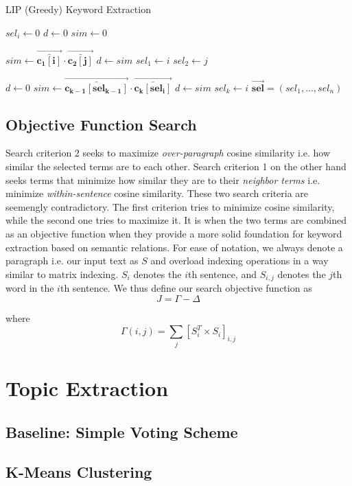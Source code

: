 \documentclass[12pt]{article}
\begin{document}
\begin{algorithm}[H]
\caption{LIP (Greedy) Keyword Extraction}\label{euclid}
\begin{algorithmic}[1]
\State $sel_i \gets 0$
 \EndFor
\State $d \gets 0$
\State $sim \gets 0$

            \State$sim \gets\bm{\vec{\bar{c_1[i]}}} \cdot \bm{\vec{\bar{c_2[j]}}}$
              \State $d \gets sim$
              \State$ sel_1 \gets i$
              \State $ sel_2 \gets j$
         \EndIf
        \EndFor
\EndFor

    \State $d \gets 0$
        \State$sim \gets \bm{\vec{\bar{c_{k-1}[sel_{k-1}]}}} \cdot \bm{\vec{\bar{c_{k}[sel_{i}]}}}$     
              \State$d \gets sim$
              \State$sel_k \gets i$
        \EndIf
    \EndFor
\EndFor
\Return $\bm{\vec{sel}} = (sel_1, ..., sel_n)$

\EndProcedure
\end{algorithmic}
\end{algorithm}


\subsection{Objective Function Search}
Search criterion 2 seeks to maximize \textit{over-paragraph} cosine similarity i.e. how similar the selected terms are to each other. Search criterion 1 on the other hand seeks terms that minimize how similar they are to their \textit{neighbor terms} i.e. minimize \textit{within-sentence} cosine similarity. These two search criteria are seemengly contradictory. The first criterion tries to minimize cosine similarity, while the second one tries to maximize it. It is when the two terms are combined as an objective function when they provide a more solid foundation for keyword extraction based on semantic relations. For ease of notation, we always denote a paragraph i.e. our input text as $S$ and overload indexing operations in a way similar to matrix indexing. $S_{i}$ denotes the $i$th sentence, and $S_{i,j}$ denotes the $j$th word in the $i$th sentence. We thus define our search objective function as 
\[J = \Gamma - \Delta\]

where
\[\Gamma(i,j) = \sum\limits_{j} [S_{i}^ T \times S_{i}]_{i,j}\]



\section{Topic Extraction}
\subsection{Baseline: Simple Voting Scheme}
\subsection{K-Means Clustering}
\end{document}
